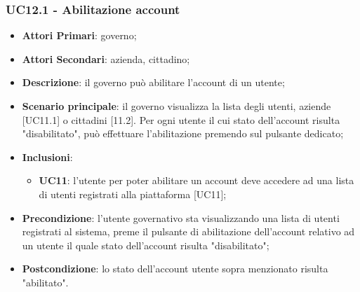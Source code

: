 \subsubsection{UC12.1 - Abilitazione account}
\begin{itemize}
	\item \textbf{Attori Primari}:
	governo;
	\item \textbf{Attori Secondari}:
	azienda, cittadino;
	\item \textbf{Descrizione}: il governo può abilitare l'account di un utente;
	\item \textbf{Scenario principale}: il governo visualizza la lista degli utenti, aziende [UC11.1] o cittadini [11.2]. Per ogni utente il cui stato dell'account risulta "disabilitato", può effettuare l'abilitazione premendo sul pulsante dedicato;
	\item \textbf{Inclusioni}: 
	\begin{itemize}
		\item \textbf{UC11}: l'utente per poter abilitare un account deve accedere ad una lista di utenti registrati alla piattaforma [UC11];
	\end{itemize}
	\item \textbf{Precondizione}: l'utente governativo sta visualizzando una lista di utenti registrati al sistema, preme il pulsante di abilitazione dell'account relativo ad un utente il quale stato dell'account risulta "disabilitato";
	\item \textbf{Postcondizione}: lo stato  dell'account utente sopra menzionato risulta "abilitato".
\end{itemize} 


